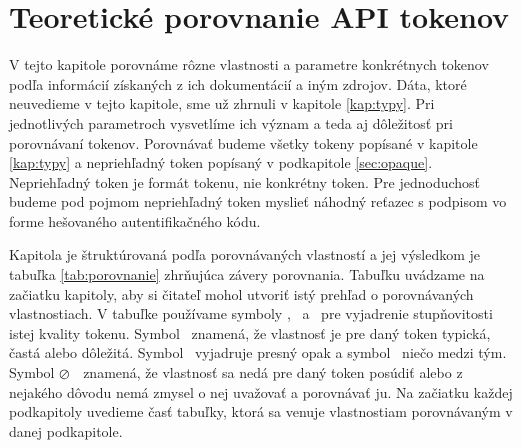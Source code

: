 \chapter{Teoretické porovnanie API tokenov}

\label{kap:teoreticke} %

V tejto kapitole porovnáme rôzne vlastnosti a parametre konkrétnych tokenov podľa informácií získaných z ich dokumentácií a iným zdrojov. Dáta, ktoré neuvedieme v tejto kapitole, sme už zhrnuli v kapitole \ref{kap:typy}. Pri jednotlivých parametroch vysvetlíme ich význam a teda aj dôležitosť pri porovnávaní tokenov. Porovnávať budeme všetky tokeny popísané v kapitole \ref{kap:typy} a nepriehľadný token popísaný v podkapitole \ref{sec:opaque}. Nepriehľadný token je formát tokenu, nie konkrétny token. Pre jednoduchosť budeme pod pojmom nepriehľadný token myslieť náhodný reťazec s podpisom vo forme hešovaného autentifikačného kódu. 

Kapitola je štruktúrovaná podľa porovnávaných vlastností a jej výsledkom je tabuľka \ref{tab:porovnanie} zhrňujúca závery porovnania. Tabuľku uvádzame na začiatku kapitoly, aby si čitateľ mohol utvoriť istý prehľad o porovnávaných vlastnostiach. V tabuľke používame symboly \CIRCLE, \LEFTcircle ~a \Circle ~pre vyjadrenie stupňovitosti istej kvality tokenu. Symbol \CIRCLE ~znamená, že vlastnosť je pre daný token typická, častá alebo dôležitá. Symbol \Circle ~vyjadruje presný opak a symbol \LEFTcircle ~niečo medzi tým. Symbol $\varoslash$ ~znamená, že vlastnosť sa nedá pre daný token posúdiť alebo z nejakého dôvodu nemá zmysel o nej uvažovať a porovnávať ju. Na začiatku každej podkapitoly uvedieme časť tabuľky, ktorá sa venuje vlastnostiam porovnávaným v danej podkapitole.


